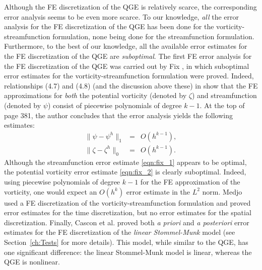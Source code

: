 Although the FE discretization of the QGE is relatively scarce, the
corresponding error analysis seems to be even more scarce. To our knowledge,
\emph{all} the error analysis for the FE discretization of the QGE has been
done for the vorticity-streamfunction formulation, none being done for the
streamfunction formulation. Furthermore, to the best of our knowledge, all the
available error estimates for the FE discretization of the QGE are
\emph{suboptimal}. The first FE error analysis for the FE discretization of
the QGE was carried out by Fix \cite{Fix}, in which suboptimal error estimates
for the vorticity-streamfunction formulation were proved. Indeed, relationships
(4.7) and (4.8) (and the discussion above these) in \cite{Fix} show that the FE
approximations for \emph{both} the potential vorticity (denoted by $\zeta$) and
streamfunction (denoted by $\psi$) consist of piecewise polynomials of degree
$k-1$. At the top of page 381, the author concludes that the error analysis
yields the following estimates:
\begin{eqnarray}
  \| \psi - \psi^h \|_1 &=& O(h^{k-1}), \label{eqn:fix_1} \\
  \| \zeta - \zeta ^h \|_0 &=& O(h^{k-1}) . \label{eqn:fix_2}
\end{eqnarray}
Although the streamfunction error estimate \eqref{eqn:fix_1} appears to be
optimal, the potential vorticity error estimate \eqref{eqn:fix_2} is clearly
suboptimal. Indeed, using piecewise polynomials of degree $k-1$ for the FE
approximation of the vorticity, one would expect an $O(h^k)$ error estimate in
the $L^2$ norm. Medjo \cite{Medjo99, Medjo00} used a FE discretization of the
vorticity-streamfunction formulation and proved error estimates for the time
discretization, but no error estimates for the spatial discretization. Finally,
Cascon et al. \cite{Cascon} proved both \emph{a priori} and \emph{a posteriori}
error estimates for the FE discretization of the \emph{linear Stommel-Munk}
model (see Section~\ref{ch:Tests} for more details). This model, while similar
to the QGE, has one significant difference: the linear Stommel-Munk model is
linear, whereas the QGE is nonlinear.

